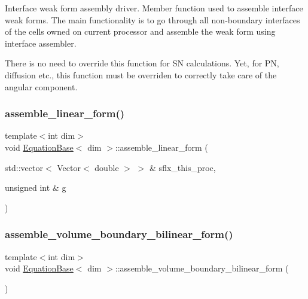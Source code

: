 Interface weak form assembly driver. Member function used to assemble interface weak forms. The main functionality is to go through all non-\/boundary interfaces of the cells owned on current processor and assemble the weak form using interface assembler. 

There is no need to override this function for SN calculations. Yet, for PN, diffusion etc., this function must be overriden to correctly take care of the angular component. \mbox{\label{class_equation_base_ac08c0b8c03ccd29f0b9eb49f6e63f8e9}} 
\subsubsection{\texorpdfstring{assemble\+\_\+linear\+\_\+form()}{assemble\_linear\_form()}}
{\footnotesize\ttfamily template$<$int dim$>$ \\
void \hyperlink{class_equation_base}{Equation\+Base}$<$ dim $>$\+::assemble\+\_\+linear\+\_\+form (\begin{DoxyParamCaption}\item[{std\+::vector$<$ Vector$<$ double $>$ $>$ \&}]{sflx\+\_\+this\+\_\+proc,  }\item[{unsigned int \&}]{g }\end{DoxyParamCaption})\hspace{0.3cm}{\ttfamily [virtual]}}

\mbox{\label{class_equation_base_a42472101cbaeab32d22c4e8ff1dc9830}} 
\subsubsection{\texorpdfstring{assemble\+\_\+volume\+\_\+boundary\+\_\+bilinear\+\_\+form()}{assemble\_volume\_boundary\_bilinear\_form()}}
{\footnotesize\ttfamily template$<$int dim$>$ \\
void \hyperlink{class_equation_base}{Equation\+Base}$<$ dim $>$\+::assemble\+\_\+volume\+\_\+boundary\+\_\+bilinear\+\_\+form (\begin{DoxyParamCaption}{ }\end{DoxyParamCaption})\hspace{0.3cm}{\ttfamily [virtual]}}

